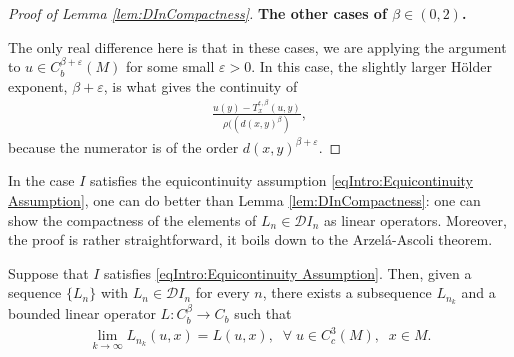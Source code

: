 \documentclass[11pt,reqno]{amsart}
\numberwithin{equation}{section}
\theoremstyle{plain}
\def\D{\mathcal D}
\def\ep{\varepsilon}
\begin{document}
\begin{proof}[Proof of Lemma \ref{lem:DInCompactness}]
	\textbf{The other cases of $\beta\in(0,2)$.}
	
	The only real difference here is that in these cases, we are applying the argument to $u\in C^{\beta+\ep}_b(M)$ for some small $\ep>0$. In this case, the slightly larger H\"older exponent, $\beta+\ep$, is what gives the continuity of
	\begin{align*}
		\frac{u(y)-T^{\epsilon,\beta}_x(u,y)}{\rho((d(x,y)^\beta)},
	\end{align*} 
	because the numerator is of the order $d(x,y)^{\beta+\ep}$.
\end{proof}

In the case $I$ satisfies the equicontinuity assumption \eqref{eqIntro:Equicontinuity Assumption}, one can do better than Lemma \ref{lem:DInCompactness}: one can show the compactness of the elements of $L_n \in \mathcal{D}I_n$ as linear operators. Moreover, the proof is rather straightforward, it boils down to the Arzel\'a-Ascoli theorem. 
\begin{lem}\label{lem:DInCompactness Strong}
  Suppose that $I$ satisfies \eqref{eqIntro:Equicontinuity Assumption}. Then, given a sequence $\{L_n\}$ with $L_n \in \D I_n$ for every $n$, there exists a subsequence $L_{n_k}$ and a bounded linear operator $L:C^\beta_b \to C_b$ such that
  \begin{align*}
    \lim\limits_{k\to\infty} L_{n_k}(u,x) =  L(u,x),\;\;\forall\;u\in C^3_c(M),\;\;x\in M.
  \end{align*}	  
\end{lem}
\end{document}

